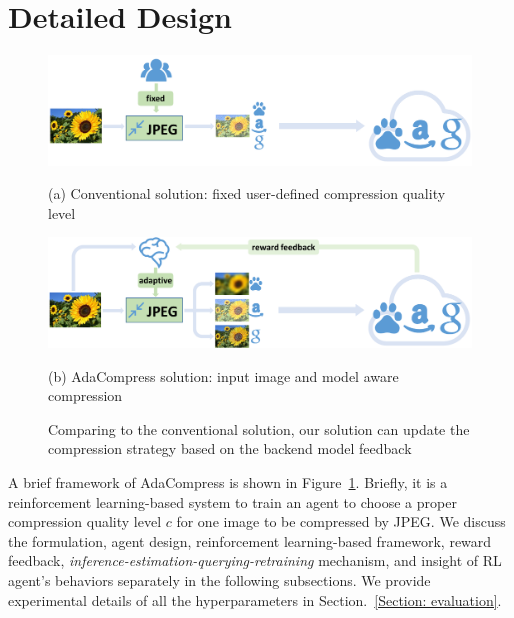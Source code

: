\section{Detailed Design}
\label{Section: design}

\begin{figure}[!t]
	\begin{minipage}{\linewidth}
		\centerline{\includegraphics[width=0.8\linewidth]{figures/conventional-framework.pdf}}
		\begin{center}
			{(a) Conventional solution: fixed user-defined compression quality level}
		\end{center}
	\end{minipage}
	\vfill
	\vspace{0.4cm}
	\begin{minipage}{\linewidth}
		\centerline{\includegraphics[width=0.8\linewidth]{figures/adaptive-framework.pdf}}
		\vspace{0.2cm}
		\begin{center}
			{(b) AdaCompress solution: input image and model aware compression}
		\end{center}
	\end{minipage}
	\caption{Comparing to the conventional solution, our solution can update the compression strategy based on the backend model feedback}
	\label{fig: framework}
\end{figure}

A brief framework of AdaCompress is shown in Figure~\ref{fig: framework}. Briefly, it is a reinforcement learning-based system to train an agent to choose a proper compression quality level $ c $ for one image to be compressed by JPEG. We discuss the formulation, agent design, reinforcement learning-based framework, reward feedback, \emph{inference-estimation-querying-retraining} mechanism, and insight of RL agent's behaviors separately in the following subsections. We provide experimental details of all the hyperparameters in Section.~\ref{Section: evaluation}. %


